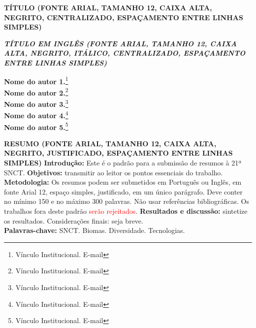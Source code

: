 \documentclass[12pt]{article}
\begin{document}
\thispagestyle{firstpage} %
\vspace*{0.2cm}
\begin{center}
    \singlespacing
    \textbf{TÍTULO (FONTE ARIAL, TAMANHO 12, CAIXA ALTA, NEGRITO, CENTRALIZADO, ESPAÇAMENTO ENTRE LINHAS SIMPLES)}
\end{center}
\begin{center}
    \singlespacing
    \textit{\textbf{TÍTULO EM INGLÊS (FONTE ARIAL, TAMANHO 12, CAIXA ALTA, NEGRITO, ITÁLICO, CENTRALIZADO, ESPAÇAMENTO ENTRE LINHAS SIMPLES)}}
\end{center}

\begin{flushright}
    \singlespacing
    \textbf{Nome do autor 1.}\footnote{Vínculo Institucional. E-mail}\\
    \textbf{Nome do autor 2.}\footnote{Vínculo Institucional. E-mail}\\
    \textbf{Nome do autor 3.}\footnote{Vínculo Institucional. E-mail}\\
    \textbf{Nome do autor 4.}\footnote{Vínculo Institucional. E-mail}\\
    \textbf{Nome do autor 5.}\footnote{Vínculo Institucional. E-mail}
\end{flushright}
{\setlength{\parindent}{0cm} \singlespacing %
\textbf{RESUMO (FONTE ARIAL, TAMANHO 12, CAIXA ALTA, NEGRITO, JUSTIFICADO, ESPAÇAMENTO ENTRE LINHAS SIMPLES)}
\textbf{Introdução:} Este é o padrão para a submissão de resumos à 21ª SNCT. \textbf{Objetivos:} transmitir ao leitor os pontos essenciais do trabalho. \textbf{Metodologia:} Os resumos podem ser submetidos em Português ou Inglês, em fonte Arial 12, espaço simples, justificado, em um único parágrafo. Deve conter no mínimo 150 e no máximo 300 palavras. Não usar referências bibliográficas. Os trabalhos fora deste padrão \textcolor{red}{serão rejeitados}. \textbf{Resultados e discussão:} sintetize os resultados. Considerações finais: seja breve.\\

\textbf{Palavras-chave:} SNCT. Biomas. Diversidade. Tecnologias.\\
}
\end{document}
